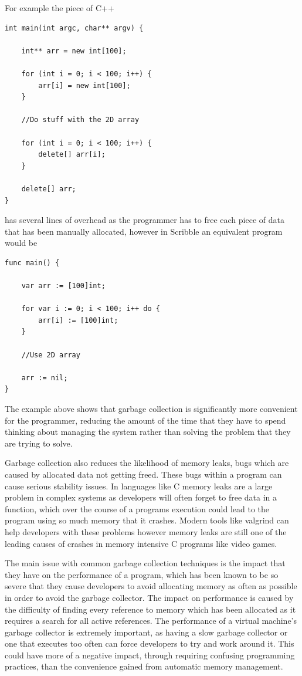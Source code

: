 \documentclass[]{final_report}
\begin{document}
For example the piece of C++
\begin{verbatim}
int main(int argc, char** argv) {

	int** arr = new int[100];
	
	for (int i = 0; i < 100; i++) {
		arr[i] = new int[100];		
	}
	
	//Do stuff with the 2D array
	
	for (int i = 0; i < 100; i++) {
		delete[] arr[i];
	}
	
	delete[] arr;
}
\end{verbatim}
has several lines of overhead as the programmer has to free each piece of data that has been manually allocated, however in Scribble an equivalent program would be
\begin{verbatim}
func main() {

	var arr := [100]int;
	
	for var i := 0; i < 100; i++ do {
		arr[i] := [100]int;
	}
	
	//Use 2D array
	
	arr := nil;
}
\end{verbatim}

The example above shows that garbage collection is significantly more convenient for the programmer, reducing the amount of the time that they have to spend thinking about managing the system rather than solving the problem that they are trying to solve.

Garbage collection also reduces the likelihood of memory leaks, bugs which are caused by allocated data not getting freed. These bugs within a program can cause serious stability issues. In languages like C memory leaks are a large problem in complex systems as developers will often forget to free data in a function, which over the course of a programs execution could lead to the program using so much memory that it crashes. Modern tools like valgrind can help developers with these problems however memory leaks are still one of the leading causes of crashes in memory intensive C programs like video games.

The main issue with common garbage collection techniques is the impact that they have on the performance of a program, which has been known to be so severe that they cause developers to avoid allocating memory as often as possible in order to avoid the garbage collector. The impact on performance is caused by the difficulty of finding every reference to memory which has been allocated as it requires a search for all active references. The performance of a virtual machine's garbage collector is extremely important, as having a slow garbage collector or one that executes too often can force developers to try and work around it. This could have more of a negative impact, through requiring confusing programming practices, than the convenience gained from automatic memory management.
\end{document}

